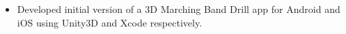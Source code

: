 \begin{itemize}
	\item Developed initial version of a 3D Marching Band Drill app for Android and iOS using Unity3D and Xcode respectively.
\end{itemize}